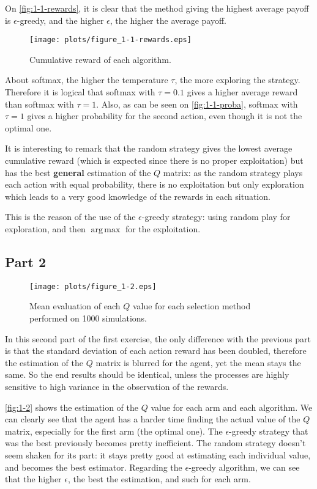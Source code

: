 \documentclass{article}
\DeclareMathOperator*{\argmax}{arg\,max}
\begin{document}
On \autoref{fig:1-1-rewards}, it is clear that the method giving the highest average payoff is $\epsilon$-greedy, and the higher $\epsilon$,
the higher the average payoff.

\begin{figure}[!b]
\centering
\texttt{[image: plots/figure\_1-1-rewards.eps]}
\caption{Cumulative reward of each algorithm.\label{fig:1-1-rewards}}
\end{figure}

About softmax, the higher the temperature $\tau$, the more exploring the strategy. Therefore it is logical that softmax with $\tau=0.1$
gives a higher average reward than softmax with $\tau=1$. Also, as can be seen on \autoref{fig:1-1-proba}, softmax with $\tau=1$ gives a
higher probability for the second action, even though it is not the optimal one.

It is interesting to remark that the random strategy gives the lowest average cumulative reward (which is expected since there is
no proper exploitation) but has the best \textbf{general} estimation of the $Q$ matrix: as the random strategy plays each action
with equal probability, there is no exploitation but only exploration which leads to a very good knowledge of the rewards in each situation.

This is the reason of the use of the $\epsilon$-greedy strategy: using random play for exploration, and then $\argmax$ for the
exploitation.

\subsection{Part 2}

\begin{figure}[!b]
\hspace{-3cm}
\texttt{[image: plots/figure\_1-2.eps]}
\caption{Mean evaluation of each $Q$ value for each selection method performed on 1000 simulations.\label{fig:1-2}}
\end{figure}

In this second part of the first exercise, the only difference with the previous part is that the standard deviation of each
action reward has been doubled, therefore the estimation of the $Q$ matrix is blurred for the agent, yet the mean stays the same.
So the end results should be identical, unless the processes are highly sensitive to high variance in the observation of the rewards.

\autoref{fig:1-2} shows the estimation of the $Q$ value for each arm and each algorithm. We can clearly see that the agent has a harder time
finding the actual value of the $Q$ matrix, especially for the first arm (the optimal one). The $\epsilon$-greedy strategy that was the best
previously becomes pretty inefficient. The random strategy doesn't seem shaken for its part: it stays pretty good at estimating each individual
value, and becomes the best estimator. Regarding the $\epsilon$-greedy algorithm, we can see that the higher $\epsilon$, the best the estimation,
and such for each arm.
\end{document}
